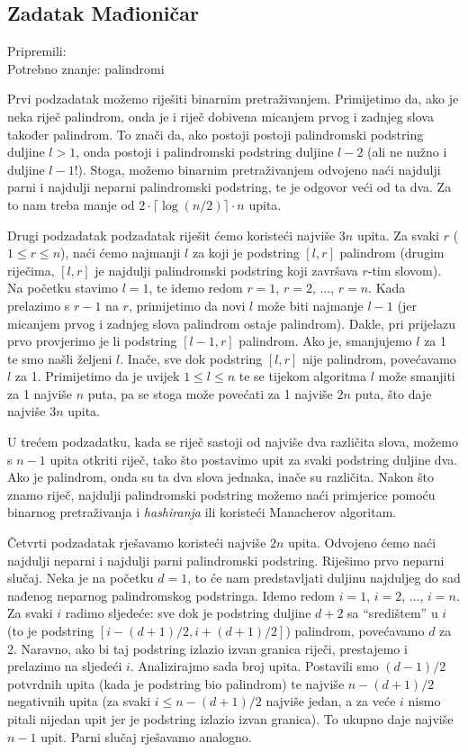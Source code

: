 \subsection*{Zadatak Mađioničar}
\textsf{Pripremili: }\\
\textsf{Potrebno znanje: palindromi}

Prvi podzadatak možemo riješiti binarnim pretraživanjem. Primijetimo da, ako je
neka riječ palindrom, onda je i riječ dobivena micanjem prvog i zadnjeg slova također palindrom.
To znači da, ako postoji postoji palindromski podstring duljine $l > 1$, onda postoji i palindromski podstring duljine $l - 2$ (ali ne nužno i duljine $l - 1$!).
Stoga, možemo binarnim pretraživanjem odvojeno naći najdulji parni i najdulji neparni palindromski podstring, te je odgovor veći od ta dva.
Za to nam treba manje od $2 \cdot \lceil{\log(n/2)}\rceil \cdot n$ upita.

Drugi podzadatak podzadatak riješit ćemo koristeći najviše $3n$ upita.
Za svaki $r$ ($1 \leq r \leq n$), naći ćemo najmanji $l$ za koji je
podstring $[l, r]$ palindrom (drugim riječima, $[l, r]$ je 
najdulji palindromski podstring koji završava $r$-tim slovom).
Na početku stavimo $l = 1$, te idemo redom $r = 1$, $r = 2$, ..., $r = n$.
Kada prelazimo s $r - 1$ na $r$, primijetimo da novi $l$ može biti najmanje $l - 1$ (jer micanjem prvog i zadnjeg slova palindrom ostaje palindrom). Dakle, pri prijelazu
prvo provjerimo je li podstring $[l - 1, r]$ palindrom. Ako je, smanjujemo $l$ za 1 te smo našli željeni $l$. Inače, sve dok podstring $[l, r]$ nije palindrom, povećavamo $l$ za 1.
Primijetimo da je uvijek $1 \leq l \leq n$ te se tijekom algoritma $l$ može smanjiti za 1 najviše $n$ puta,
pa se stoga može povećati za 1 najviše $2n$ puta, što daje najviše $3n$ upita.

U trećem podzadatku, kada se riječ sastoji od najviše dva različita slova, možemo 
s $n - 1$ upita otkriti riječ, tako što postavimo upit za svaki podstring duljine dva.
Ako je palindrom, onda su ta dva slova jednaka, inače su različita. Nakon što znamo riječ,
najdulji palindromski podstring možemo naći primjerice pomoću binarnog pretraživanja i \textit{hashiranja} ili koristeći Manacherov algoritam.

Četvrti podzadatak rješavamo koristeći najviše $2n$ upita.
Odvojeno ćemo naći najdulji neparni i najdulji parni palindromski podstring.
Riješimo prvo neparni slučaj. Neka je na početku $d = 1$, to će nam predstavljati duljinu
najduljeg do sad nađenog neparnog palindromskog podstringa. Idemo redom $i = 1$, $i = 2$, ..., $i = n$.
Za svaki $i$ radimo sljedeće: sve dok je podstring duljine $d + 2$ sa ``središtem'' u $i$
(to je podstring $[i - (d + 1) / 2, i + (d + 1) / 2]$) palindrom, povećavamo $d$ za 2.
Naravno, ako bi taj podstring izlazio izvan granica riječi, prestajemo i prelazimo na sljedeći $i$.
Analizirajmo sada broj upita. Postavili smo $(d - 1) / 2$ potvrdnih upita (kada je podstring bio palindrom) te najviše $n - (d + 1) / 2$ negativnih upita
(za svaki $i \leq n - (d + 1) / 2$ najviše jedan, a za veće $i$ nismo pitali nijedan upit jer je podstring izlazio izvan granica). To ukupno daje najviše $n - 1$ upit.
Parni slučaj rješavamo analogno. 
